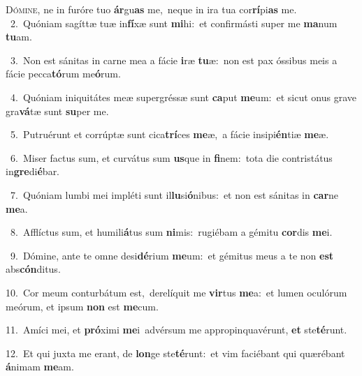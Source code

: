 \lettrine{\initial\textcolor{\initialcolor}{D}}{ómine,} ne in furóre tuo \textbf{ár}\-gu\textbf{as} me,~\star neque in ira tua cor\-\textbf{rí}\-pi\textbf{as} me.\\
{\numbfont\textcolor{\numbcolor}{~2.}}~Quóniam sagíttæ tuæ in\-\textbf{fí}\-xæ sunt \textbf{mi}\-hi:~\star et confirmásti super me \textbf{ma}\-num \textbf{tu}\-am.\par
{\numbfont\textcolor{\numbcolor}{~3.}}~Non est sánitas in carne mea a fácie \textbf{i}\-ræ \textbf{tu}\-æ:~\star non est pax óssibus meis a fácie pecca\-\textbf{tó}\-rum me\-\textbf{ó}\-rum.\par
{\numbfont\textcolor{\numbcolor}{~4.}}~Quóniam iniquitátes meæ supergréssæ sunt \textbf{ca}\-put \textbf{me}\-um:~\star et sicut onus grave gra\-\textbf{vá}\-tæ sunt \textbf{su}\-per me.\par
{\numbfont\textcolor{\numbcolor}{~5.}}~Putruérunt et corrúptæ sunt cica\-\textbf{trí}\-ces \textbf{me}\-æ,~\star a fácie insipi\-\textbf{én}\-tiæ \textbf{me}\-æ.\par
{\numbfont\textcolor{\numbcolor}{~6.}}~Miser factus sum, et curvátus sum \textbf{us}\-que in \textbf{fi}\-nem:~\star tota die contristátus in\-\textbf{gre}\-di\-\textbf{é}\-bar.\par
{\numbfont\textcolor{\numbcolor}{~7.}}~Quóniam lumbi mei impléti sunt il\-\textbf{lu}\-si\-\textbf{ó}\-nibus:~\star et non est sánitas in \textbf{car}\-ne \textbf{me}\-a.\par
{\numbfont\textcolor{\numbcolor}{~8.}}~Afflíctus sum, et humili\-\textbf{á}\-tus sum \textbf{ni}\-mis:~\star rugiébam a gémitu \textbf{cor}\-dis \textbf{me}\-i.\par
{\numbfont\textcolor{\numbcolor}{~9.}}~Dómine, ante te omne desi\-\textbf{dé}\-rium \textbf{me}\-um:~\star et gémitus meus a te non \textbf{est} abs\-\textbf{cón}\-ditus.\par
{\numbfont\textcolor{\numbcolor}{10.}}~Cor meum conturbátum est,~\dagger derelíquit me \textbf{vir}\-tus \textbf{me}\-a:~\star et lumen oculórum meórum, et ipsum \textbf{non} est \textbf{me}\-cum.\par
{\numbfont\textcolor{\numbcolor}{11.}}~Amíci mei, et \textbf{pró}\-ximi \textbf{me}\-i~\star advérsum me appropinquavérunt, \textbf{et} ste\-\textbf{té}\-runt.\par
{\numbfont\textcolor{\numbcolor}{12.}}~Et qui juxta me erant, de \textbf{lon}\-ge ste\-\textbf{té}\-runt:~\star et vim faciébant qui quærébant \textbf{á}\-nimam \textbf{me}\-am.\par
